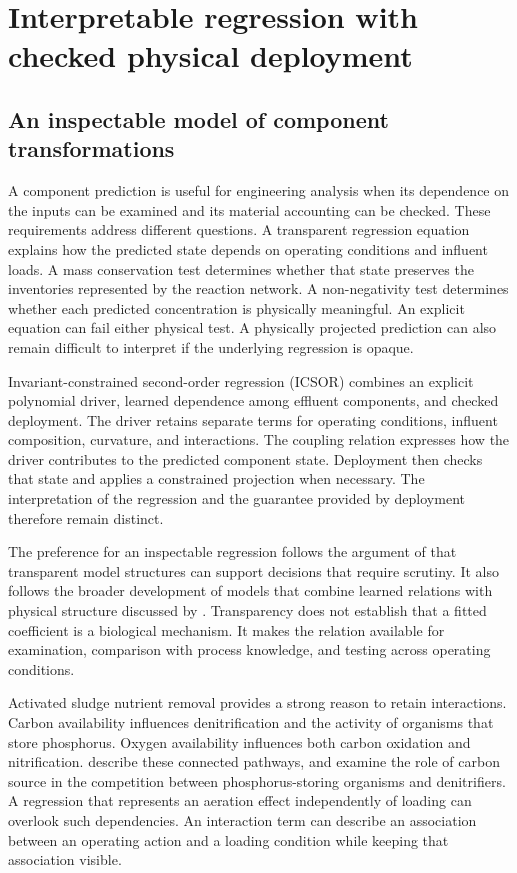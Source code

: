 \chapter{Interpretable regression with checked physical deployment}
\label{ch:interpretable}

\section{An inspectable model of component transformations}

A component prediction is useful for engineering analysis when its dependence on the inputs can be examined and its material accounting can be checked. These requirements address different questions. A transparent regression equation explains how the predicted state depends on operating conditions and influent loads. A mass conservation test determines whether that state preserves the inventories represented by the reaction network. A non-negativity test determines whether each predicted concentration is physically meaningful. An explicit equation can fail either physical test. A physically projected prediction can also remain difficult to interpret if the underlying regression is opaque.

Invariant-constrained second-order regression (ICSOR) combines an explicit polynomial driver, learned dependence among effluent components, and checked deployment. The driver retains separate terms for operating conditions, influent composition, curvature, and interactions. The coupling relation expresses how the driver contributes to the predicted component state. Deployment then checks that state and applies a constrained projection when necessary. The interpretation of the regression and the guarantee provided by deployment therefore remain distinct.

The preference for an inspectable regression follows the argument of \citet{Rudin2019} that transparent model structures can support decisions that require scrutiny. It also follows the broader development of models that combine learned relations with physical structure discussed by \citet{Shen2023}. Transparency does not establish that a fitted coefficient is a biological mechanism. It makes the relation available for examination, comparison with process knowledge, and testing across operating conditions.

Activated sludge nutrient removal provides a strong reason to retain interactions. Carbon availability influences denitrification and the activity of organisms that store phosphorus. Oxygen availability influences both carbon oxidation and nitrification. \citet{Wentzel1992} describe these connected pathways, and \citet{Guerrero2011} examine the role of carbon source in the competition between phosphorus-storing organisms and denitrifiers. A regression that represents an aeration effect independently of loading can overlook such dependencies. An interaction term can describe an association between an operating action and a loading condition while keeping that association visible.

